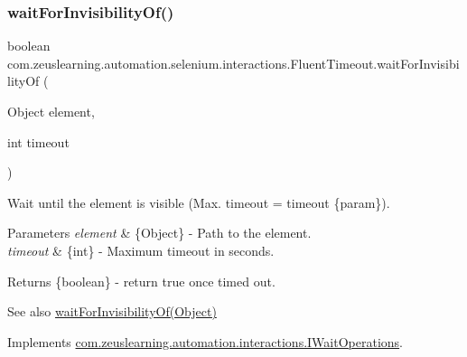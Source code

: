 \subsubsection{\texorpdfstring{wait\+For\+Invisibility\+Of()}{waitForInvisibilityOf()}\hspace{0.1cm}{\footnotesize\ttfamily [2/2]}}
{\footnotesize\ttfamily boolean com.\+zeuslearning.\+automation.\+selenium.\+interactions.\+Fluent\+Timeout.\+wait\+For\+Invisibility\+Of (\begin{DoxyParamCaption}\item[{Object}]{element,  }\item[{int}]{timeout }\end{DoxyParamCaption})\hspace{0.3cm}{\ttfamily [inline]}}

Wait until the element is visible (Max. timeout = timeout \{param\}).


\begin{DoxyParams}{Parameters}
{\em element} & \{Object\} -\/ Path to the element. \\
\hline
{\em timeout} & \{int\} -\/ Maximum timeout in seconds.\\
\hline
\end{DoxyParams}
\begin{DoxyReturn}{Returns}
\{boolean\} -\/ return {\ttfamily true} once timed out.
\end{DoxyReturn}
\begin{DoxySeeAlso}{See also}
\hyperlink{classcom_1_1zeuslearning_1_1automation_1_1selenium_1_1interactions_1_1FluentTimeout_ad385151878bb0bd5e034cb4769c206f5}{wait\+For\+Invisibility\+Of(\+Object)} 
\end{DoxySeeAlso}


Implements \hyperlink{interfacecom_1_1zeuslearning_1_1automation_1_1interactions_1_1IWaitOperations_a816b3d7ef80895d1cf54cc657a10204e}{com.\+zeuslearning.\+automation.\+interactions.\+I\+Wait\+Operations}.

\hypertarget{classcom_1_1zeuslearning_1_1automation_1_1selenium_1_1interactions_1_1FluentTimeout_a9d12d8da29ae600e1955e244a79f2ec0}{}\label{classcom_1_1zeuslearning_1_1automation_1_1selenium_1_1interactions_1_1FluentTimeout_a9d12d8da29ae600e1955e244a79f2ec0} 
